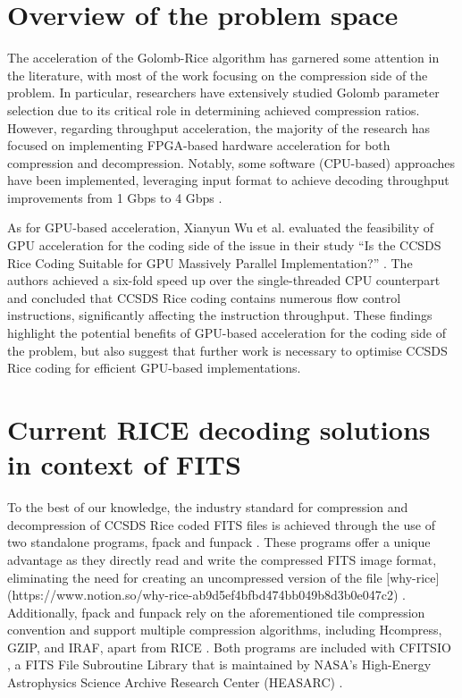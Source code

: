 \documentclass[licencjacka,en]{pracamgr}
\begin{document}
\section{Overview of the problem space}
The acceleration of the Golomb-Rice algorithm has garnered some attention in the literature, with most of the work focusing on the compression side of the problem. In particular, researchers have extensively studied Golomb parameter selection due to its critical role in determining achieved compression ratios. However, regarding throughput acceleration, the majority of the research has focused on implementing FPGA-based hardware acceleration for both compression and decompression. Notably, some software (CPU-based) approaches have been implemented, leveraging input format to achieve decoding throughput improvements from 1 Gbps to 4 Gbps \cite{fpga-dec}.

As for GPU-based acceleration, Xianyun Wu et al. evaluated the feasibility of GPU acceleration for the coding side of the issue in their study “Is the CCSDS Rice Coding Suitable for GPU Massively Parallel Implementation?” \cite{gpu-rice}. The authors achieved a six-fold speed up over the single-threaded CPU counterpart and concluded that CCSDS Rice coding contains numerous flow control instructions, significantly affecting the instruction throughput. These findings highlight the potential benefits of GPU-based acceleration for the coding side of the problem, but also suggest that further work is necessary to optimise CCSDS Rice coding for efficient GPU-based implementations.

\section{Current RICE decoding solutions in context of FITS}
To the best of our knowledge, the industry standard for compression and decompression of CCSDS Rice coded FITS files is achieved through the use of two standalone programs, fpack and funpack \cite{funpack-man}. These programs offer a unique advantage as they directly read and write the compressed FITS image format, eliminating the need for creating an uncompressed version of the file [why-rice](https://www.notion.so/why-rice-ab9d5ef4bfbd474bb049b8d3b0e047c2) . Additionally, fpack and funpack rely on the aforementioned tile compression convention and support multiple compression algorithms, including Hcompress, GZIP, and IRAF, apart from RICE \cite{funpack-user}. Both programs are included with CFITSIO\cite{funpack-man} , a FITS File Subroutine Library that is maintained by NASA’s High-Energy Astrophysics Science Archive Research Center (HEASARC) \cite{cfitsio}.
\end{document}
